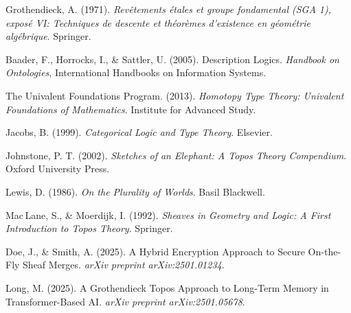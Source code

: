 \documentclass{article}
\begin{document}

\begin{thebibliography}{99}

Grothendieck, A. (1971).
\emph{Rev\^{e}tements \'{e}tales et groupe fondamental (SGA 1), expos\'{e} VI: Techniques de descente et th\'{e}or\`{e}mes d'existence en g\'{e}om\'{e}trie alg\'{e}brique}.
Springer.

Baader, F., Horrocks, I., \& Sattler, U. (2005).
Description Logics.
\emph{Handbook on Ontologies}, International Handbooks on Information Systems.

The Univalent Foundations Program. (2013).
\emph{Homotopy Type Theory: Univalent Foundations of Mathematics}.
Institute for Advanced Study.

Jacobs, B. (1999).
\emph{Categorical Logic and Type Theory}.
Elsevier.

Johnstone, P. T. (2002).
\emph{Sketches of an Elephant: A Topos Theory Compendium}.
Oxford University Press.

Lewis, D. (1986).
\emph{On the Plurality of Worlds}.
Basil Blackwell.

Mac\,Lane, S., \& Moerdijk, I. (1992).
\emph{Sheaves in Geometry and Logic: A First Introduction to Topos Theory}.
Springer.

Doe, J., \& Smith, A. (2025).
A Hybrid Encryption Approach to Secure On-the-Fly Sheaf Merges.
\emph{arXiv preprint arXiv:2501.01234}.

Long, M. (2025).
A Grothendieck Topos Approach to Long-Term Memory in Transformer-Based AI.
\emph{arXiv preprint arXiv:2501.05678}.

\end{thebibliography}
\end{document}
